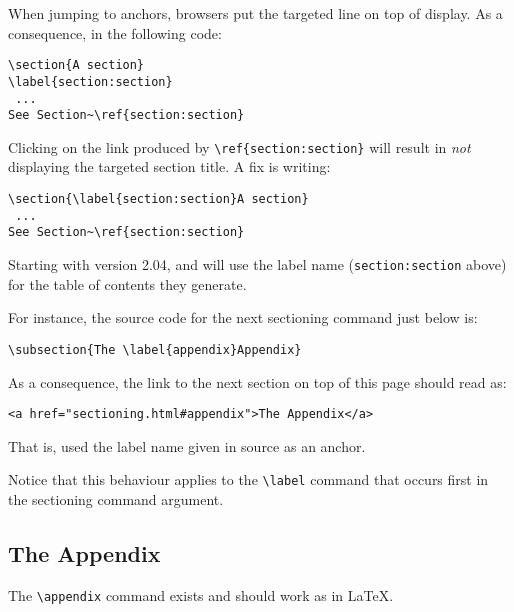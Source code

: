 %
When jumping to anchors, browsers put the targeted line on top
of display. As a consequence, in the following code:
\begin{verbatim}
\section{A section}
\label{section:section}
 ...
See Section~\ref{section:section}
\end{verbatim}
Clicking on the link produced by
\verb"\ref{section:section}" will result in \emph{not} displaying the
targeted section title.
A fix is writing:
\begin{verbatim}
\section{\label{section:section}A section}
 ...
See Section~\ref{section:section}
\end{verbatim}

Starting with version 2.04, \hevea{} and \hacha{} will use the label name
(\verb+section:section+ above) for the table of  contents they generate.
\begin{htmlonly}
For instance, the source code for the next sectioning command just
below is:
\begin{verbatim}
\subsection{The \label{appendix}Appendix}
\end{verbatim}
As a consequence, the link to the next section on top
of this page should read as:
\begin{verbatim}
<a href="sectioning.html#appendix">The Appendix</a>
\end{verbatim}
That is, \hevea{} used the label name given in source as
an anchor.
\end{htmlonly}
Notice that this behaviour applies to the \verb+\label+ command
that occurs first in the sectioning command argument.

\subsection{The \label{appendix}Appendix}
The \verb+\appendix+ command exists and should work as in \LaTeX.

